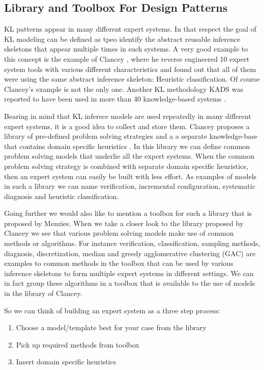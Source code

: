 \documentclass[conference]{IEEEtran}
\begin{document}



\subsection{Library and Toolbox For Design Patterns}
\label{section:library}
KL patterns appear in many different expert systems.  In that respect
the goal of KL modeling can be defined as tpeo identify the abstract
reusable inference skeletons that appear multiple times in such
systems.  A very good example to this concept is the example of
Clancey \cite{Clancey1985}, where he reverse engineered 10 expert
system tools with various different characteristics and found out that
all of them were using the same abstract inference skeleton: Heuristic
classification.  Of course Clancey's example is not the only one.
Another KL methodology KADS \cite{Wielinga1992} was reported to have
been used in more than 40 knowledge-based systems
\cite{Menzies97object-orientedpatterns:}.

Bearing in mind that KL inferece models are used repeatedly in many
different expert systems, it is a good idea to collect and store them.
Clancey proposes a library of pre-defined problem solving strategies
and a a separate knowledge-base that contains domain specific
heuristics \cite{Wielinga1992}.  In this library we can define common
problem solving models that underlie all the expert systems.  When the
common problem solving strategy is combined with separate domain
specific heuristics, then an expert system can easily be built with
less effort.  As examples of models in such a library we can name
verification, incremental configuration, systematic diagnosis and
heuristic classification.

Going further we would also like to mention a toolbox for such a
library that is proposed by Menzies\cite{Menzies2009}.  When we take a
closer look to the library proposed by Clancey \cite{Wielinga1992} we
see that various problem solving models make use of common methods or
algorithms.  For instance verification, classification, sampling
methods, diagnosis, discretization, median and greedy agglomerative
clustering (GAC) are examples to common methods in the toolbox that
can be used by various inference skeletons to form multiple expert
systems in different settings.  We can in fact group these algorithms
in a toolbox that is available to the use of models in the library of
Clancey.

So we can think of building an expert system as a three step process:
\begin{enumerate}
\item Choose a model/template best for your case from the library
\item Pick up required methods from toolbox
\item Insert domain specific heuristics
\end{enumerate}
\end{document}

